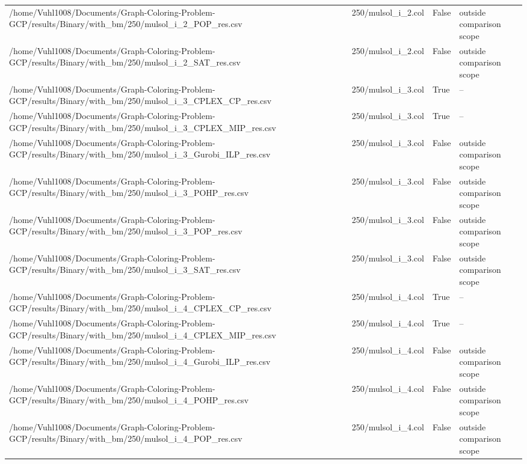 \begin{table}[htbp]
\begin{tabular}{llll}
/home/Vuhl1008/Documents/Graph-Coloring-Problem-GCP/results/Binary/with\_bm/250/mulsol\_i\_2\_POP\_res.csv & 250/mulsol\_i\_2.col & False & outside comparison scope \\
/home/Vuhl1008/Documents/Graph-Coloring-Problem-GCP/results/Binary/with\_bm/250/mulsol\_i\_2\_SAT\_res.csv & 250/mulsol\_i\_2.col & False & outside comparison scope \\
/home/Vuhl1008/Documents/Graph-Coloring-Problem-GCP/results/Binary/with\_bm/250/mulsol\_i\_3\_CPLEX\_CP\_res.csv & 250/mulsol\_i\_3.col & True & -- \\
/home/Vuhl1008/Documents/Graph-Coloring-Problem-GCP/results/Binary/with\_bm/250/mulsol\_i\_3\_CPLEX\_MIP\_res.csv & 250/mulsol\_i\_3.col & True & -- \\
/home/Vuhl1008/Documents/Graph-Coloring-Problem-GCP/results/Binary/with\_bm/250/mulsol\_i\_3\_Gurobi\_ILP\_res.csv & 250/mulsol\_i\_3.col & False & outside comparison scope \\
/home/Vuhl1008/Documents/Graph-Coloring-Problem-GCP/results/Binary/with\_bm/250/mulsol\_i\_3\_POHP\_res.csv & 250/mulsol\_i\_3.col & False & outside comparison scope \\
/home/Vuhl1008/Documents/Graph-Coloring-Problem-GCP/results/Binary/with\_bm/250/mulsol\_i\_3\_POP\_res.csv & 250/mulsol\_i\_3.col & False & outside comparison scope \\
/home/Vuhl1008/Documents/Graph-Coloring-Problem-GCP/results/Binary/with\_bm/250/mulsol\_i\_3\_SAT\_res.csv & 250/mulsol\_i\_3.col & False & outside comparison scope \\
/home/Vuhl1008/Documents/Graph-Coloring-Problem-GCP/results/Binary/with\_bm/250/mulsol\_i\_4\_CPLEX\_CP\_res.csv & 250/mulsol\_i\_4.col & True & -- \\
/home/Vuhl1008/Documents/Graph-Coloring-Problem-GCP/results/Binary/with\_bm/250/mulsol\_i\_4\_CPLEX\_MIP\_res.csv & 250/mulsol\_i\_4.col & True & -- \\
/home/Vuhl1008/Documents/Graph-Coloring-Problem-GCP/results/Binary/with\_bm/250/mulsol\_i\_4\_Gurobi\_ILP\_res.csv & 250/mulsol\_i\_4.col & False & outside comparison scope \\
/home/Vuhl1008/Documents/Graph-Coloring-Problem-GCP/results/Binary/with\_bm/250/mulsol\_i\_4\_POHP\_res.csv & 250/mulsol\_i\_4.col & False & outside comparison scope \\
/home/Vuhl1008/Documents/Graph-Coloring-Problem-GCP/results/Binary/with\_bm/250/mulsol\_i\_4\_POP\_res.csv & 250/mulsol\_i\_4.col & False & outside comparison scope \\

\end{tabular}
\end{table}
